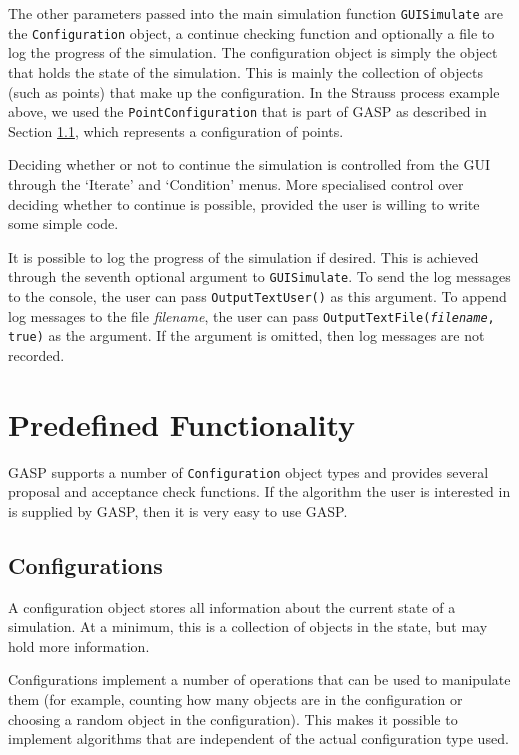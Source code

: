 The other parameters passed into the main simulation function
\texttt{GUI\-Simulate} are the \texttt{Configuration} object, a
continue checking function and optionally a file to log the progress
of the simulation.  The configuration object is simply the object that
holds the state of the simulation.  This is mainly the collection of
objects (such as points) that make up the configuration.  In the
Strauss process example above, we used the \texttt{PointConfiguration}
that is part of GASP as described in Section
\ref{sect:configurations}, which represents a configuration of points.

Deciding whether or not to continue the simulation is controlled from
the GUI through the `Iterate' and `Condition' menus.  More specialised
control over deciding whether to continue is possible, provided the
user is willing to write some simple \GAP{} code.

It is possible to log the progress of the simulation if desired.  This
is achieved through the seventh optional argument to
\texttt{GUISimulate}.  To send the log messages to the \GAP{} console,
the user can pass \texttt{OutputTextUser()} as this argument.  To
append log messages to the file \emph{filename}, the user can pass
\texttt{OutputTextFile(\emph{filename}, true)} as the argument.  If
the argument is omitted, then log messages are not recorded.


\section{Predefined Functionality}

GASP supports a number of \texttt{Configuration} object types and
provides several proposal and acceptance check functions.  If the
algorithm the user is interested in is supplied by GASP, then it is
very easy to use GASP.

\subsection{Configurations}\label{sect:configurations}

A configuration object stores all information about the current state
of a simulation.  At a minimum, this is a collection of objects in the
state, but may hold more information.

Configurations implement a number of operations that can be used to
manipulate them (for example, counting how many objects are in the
configuration or choosing a random object in the configuration).  This
makes it possible to implement algorithms that are independent of the
actual configuration type used.

